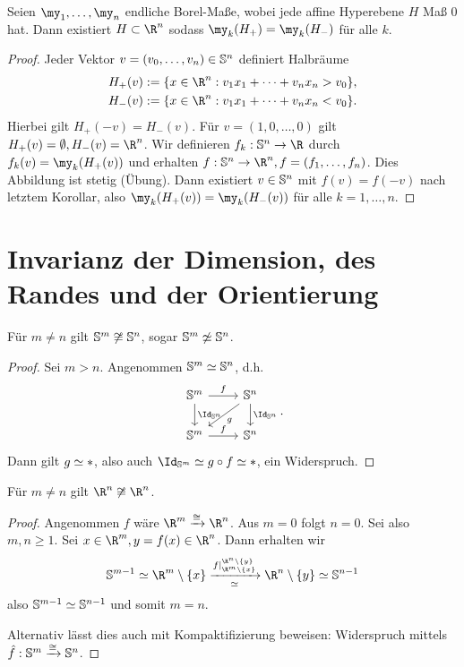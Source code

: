 \begin{st}
	Seien $\my_1, \dotsc, \my_n$ endliche Borel-Maße, wobei jede affine Hyperebene $H$ Maß 0 hat.
	Dann existiert $H \subset \R^n$ sodass $\my_k(H_+) = \my_k(H_-)$ für alle $k$.
	\begin{proof}
		Jeder Vektor $v = (v_0, \dotsc, v_n) \in \S^n$ definiert Halbräume
		\begin{align*}
			H_+(v) &:= \{x \in \R^n : v_1x_1 + \dotsb + v_n x_n > v_0 \}, \\
			H_-(v) &:= \{x \in \R^n : v_1x_1 + \dotsb + v_n x_n < v_0 \}.
		\end{align*}
		Hierbei gilt $H_+(-v) = H_-(v)$.
		Für $v = (1, 0, \dotsc, 0)$ gilt $H_+(v) = \emptyset, H_-(v) = \R^n$.
		Wir definieren $f_k: \S^n \to \R$ durch $f_k(v) = \my_k(H_+(v))$ und erhalten $f: \S^n \to \R^n, f = (f_1, \dotsc, f_n)$.
		Dies Abbildung ist stetig (Übung).
		Dann existiert $v \in \S^n$ mit $f(v) = f(-v)$ nach letztem Korollar, also $\my_k(H_+(v)) = \my_k(H_-(v))$ für alle $k = 1, \dotsc, n$.
	\end{proof}
\end{st}


\section{Invarianz der Dimension, des Randes und der Orientierung}


\begin{st}
	Für $m \neq n$ gilt $\S^m \not\homeomorphic \S^n$, sogar $\S^m \not\homotopic \S^n$.
	\begin{proof}
		Sei \oBdA $m > n$.
		Angenommen $\S^m \homotopic \S^n$, d.h.
		\[
			\begin{tikzcd}
				\S^m \arrow{r}{f} \arrow{d}{\Id_{\S^n}} & \S^n \arrow{d}{\Id_{\S^n}} \arrow{dl}{g} \\
				\S^m \arrow{r}{f} & \S^n
			\end{tikzcd}.
		\]
		Dann gilt $g \homotopic *$, also auch $\Id_{\S^m} \homotopic g \circ f \homotopic *$, ein Widerspruch.
	\end{proof}
\end{st}

\begin{kor}
	Für $m \neq n$ gilt $\R^n \not\homeomorphic \R^n$.
	\begin{proof}
		Angenommen $f$ wäre $\R^m \xrightarrow{\homeomorphic} \R^n$.
		Aus $m = 0$ folgt $n = 0$.
		Sei also $m, n \ge 1$.
		Sei $x \in \R^m, y = f(x) \in \R^n$.
		Dann erhalten wir
		\[
			\S^{m-1} \homotopic \R^m \setminus \{x\} \xrightarrow[\homotopic]{f|_{\R^m \setminus \{x\}}^{\R^n \setminus \{y\}}} \R^n \setminus \{y\} \homotopic \S^{n-1}
		\]
		also $\S^{m-1} \homotopic \S^{n-1}$ und somit $m = n$.

		Alternativ lässt dies auch mit Kompaktifizierung beweisen: Widerspruch mittels $\hat f: \S^m \xrightarrow{\homeomorphic} \S^n$.
	\end{proof}
\end{kor}

